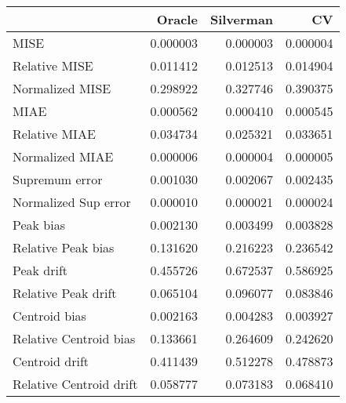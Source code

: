 \begin{tabular}{lrrr}
  \toprule
 & Oracle & Silverman & CV \\ 
  \midrule
MISE & 0.000003 & 0.000003 & 0.000004 \\ 
  Relative MISE & 0.011412 & 0.012513 & 0.014904 \\ 
  Normalized MISE & 0.298922 & 0.327746 & 0.390375 \\ 
  MIAE & 0.000562 & 0.000410 & 0.000545 \\ 
  Relative MIAE & 0.034734 & 0.025321 & 0.033651 \\ 
  Normalized MIAE & 0.000006 & 0.000004 & 0.000005 \\ 
  Supremum error & 0.001030 & 0.002067 & 0.002435 \\ 
  Normalized Sup error & 0.000010 & 0.000021 & 0.000024 \\ 
  Peak bias & 0.002130 & 0.003499 & 0.003828 \\ 
  Relative Peak bias & 0.131620 & 0.216223 & 0.236542 \\ 
  Peak drift & 0.455726 & 0.672537 & 0.586925 \\ 
  Relative Peak drift & 0.065104 & 0.096077 & 0.083846 \\ 
  Centroid bias & 0.002163 & 0.004283 & 0.003927 \\ 
  Relative Centroid bias & 0.133661 & 0.264609 & 0.242620 \\ 
  Centroid drift & 0.411439 & 0.512278 & 0.478873 \\ 
  Relative Centroid drift & 0.058777 & 0.073183 & 0.068410 \\ 
   \bottomrule
\end{tabular}
